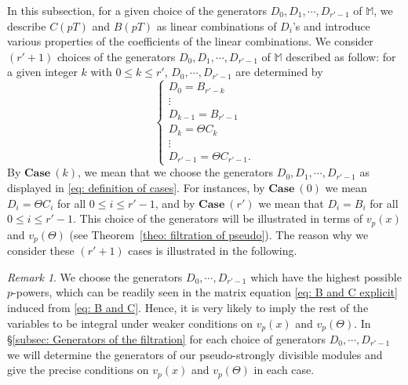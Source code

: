 \documentclass[11pt]{amsart}
\theoremstyle{definition}
\numberwithin{equation}{subsection}
\theoremstyle{plain}
\theoremstyle{plain}
\theoremstyle{plain}
\theoremstyle{plain}
\theoremstyle{plain}
\theoremstyle{plain}
\theoremstyle{plain}
\theoremstyle{plain}
\theoremstyle{plain}
\theoremstyle{plain}
\theoremstyle{plain}
\theoremstyle{plain}
\theoremstyle{definition}
\theoremstyle{definition}
\theoremstyle{definition}
\theoremstyle{remark}
\newtheorem{rema}[equation]{Remark}
\renewcommand{\(}{\textup{(}}
\renewcommand{\)}{\textup{)}}
\begin{document}
In this subsection, for a given choice of the generators $D_0,D_1,\cdots,D_{r'-1}$ of $\mathbb{M}$, we describe $C(pT)$ and $B(pT)$ as linear combinations of $D_i$'s and introduce various properties of the coefficients of the linear combinations. We consider $(r'+1)$ choices of the generators $D_0,D_1,\cdots,D_{r'-1}$ of $\mathbb{M}$ described as follow: for a given integer $k$ with $0\leq k\leq r'$, $D_0,\cdots,D_{r'-1}$ are determined by
    \begin{equation}\label{eq: definition of cases}
        \begin{cases}
            D_0=B_{r'-k}\\
            \vdots\\
            D_{k-1}=B_{r'-1}\\
            D_k=\Theta C_k\\
            \vdots\\
            D_{r'-1}=\Theta C_{r'-1}.
        \end{cases}
    \end{equation}
By $\mathbf{Case}~(k)$, we mean that we choose the generators $D_0,D_1,\cdots,D_{r'-1}$ as displayed in \eqref{eq: definition of cases}. For instances, by $\mathbf{Case}~(0)$ we mean $D_i=\Theta C_i$ for all $0\leq i\leq r'-1$, and by $\mathbf{Case}~(r')$ we mean that $D_i=B_i$ for all $0\leq i\leq r'-1$. This choice of the generators will be illustrated in terms of $v_p(x)$ and $v_p(\Theta)$ (see Theorem~\ref{theo: filtration of pseudo}). The reason why we consider these $(r'+1)$ cases is illustrated in the following.

\begin{rema}
We choose the generators $D_0,\cdots,D_{r'-1}$ which have the highest possible $p$-powers, which can be readily seen in the matrix equation \eqref{eq: B and C explicit} induced from \eqref{eq: B and C}. Hence, it is very likely to imply the rest of the variables to be integral under weaker conditions on $v_p(x)$ and $v_p(\Theta)$. In \S\ref{subsec: Generators of the filtration} for each choice of generators $D_0,\cdots,D_{r'-1}$ we will determine the generators of our pseudo-strongly divisible modules and give the precise conditions on $v_p(x)$ and $v_p(\Theta)$ in each case.
\end{rema}
\end{document}
